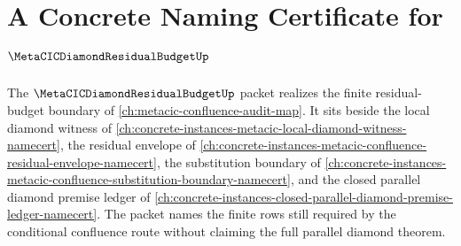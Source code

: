\chapter{A Concrete Naming Certificate for $\MetaCICDiamondResidualBudgetUp$}
\label{ch:concrete-instances-metacic-diamond-residual-budget-namecert}

The $\MetaCICDiamondResidualBudgetUp$ packet realizes the finite residual-budget boundary of \autoref{ch:metacic-confluence-audit-map}. It sits beside the local diamond witness of \autoref{ch:concrete-instances-metacic-local-diamond-witness-namecert}, the residual envelope of \autoref{ch:concrete-instances-metacic-confluence-residual-envelope-namecert}, the substitution boundary of \autoref{ch:concrete-instances-metacic-confluence-substitution-boundary-namecert}, and the closed parallel diamond premise ledger of \autoref{ch:concrete-instances-closed-parallel-diamond-premise-ledger-namecert}. The packet names the finite rows still required by the conditional confluence route without claiming the full parallel diamond theorem.

